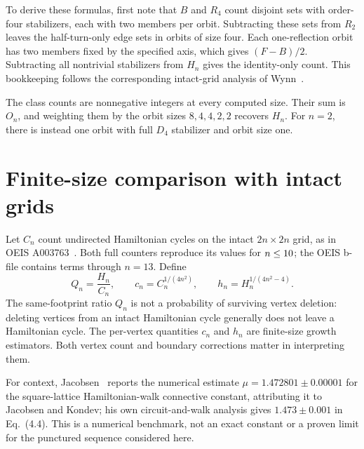 \documentclass[12pt]{amsart}
\begin{document}
To derive these formulas, first note that $B$ and $R_4$ count disjoint sets
with order-four stabilizers, each with two members per orbit. Subtracting
these sets from $R_2$ leaves the half-turn-only edge sets in orbits of size
four. Each one-reflection orbit has two members fixed by the specified axis,
which gives $(F-B)/2$. Subtracting all nontrivial stabilizers from $H_n$
gives the identity-only count. This bookkeeping follows the corresponding
intact-grid analysis of Wynn~\cite{wynn}.

\begin{table}[htbp]
\centering\small

\caption{Exact symmetry classes for the $16\times16$ punctured grid.}
\label{tab:classes}
\end{table}
The class counts are nonnegative integers at every computed size. Their sum
is $O_n$, and weighting them by the orbit sizes $8,4,4,2,2$ recovers $H_n$.
For $n=2$, there is instead one orbit with full $D_4$ stabilizer and orbit
size one.

\section{Finite-size comparison with intact grids}
Let $C_n$ count undirected Hamiltonian cycles on the intact $2n\times2n$
grid, as in OEIS A003763~\cite{oeis}. Both full counters reproduce its
values for $n\leq10$; the OEIS b-file contains terms through $n=13$. Define
\[
Q_n=\frac{H_n}{C_n},\qquad
c_n=C_n^{1/(4n^2)},\qquad h_n=H_n^{1/(4n^2-4)}.
\]
The same-footprint ratio $Q_n$ is not a probability of surviving vertex
deletion: deleting vertices from an intact Hamiltonian cycle generally
does not leave a Hamiltonian cycle. The per-vertex quantities $c_n$ and
$h_n$ are finite-size growth estimators. Both vertex count and boundary
corrections matter in interpreting them.

For context, Jacobsen~\cite[Eq.~(4.5)]{jacobsen} reports the numerical
estimate $\mu=1.472801\pm0.00001$ for the square-lattice Hamiltonian-walk
connective constant, attributing it to Jacobsen and Kondev; his own
circuit-and-walk analysis gives $1.473\pm0.001$ in Eq.~(4.4).
This is a numerical benchmark, not an exact constant or a proven limit
for the punctured sequence considered here.
\end{document}
